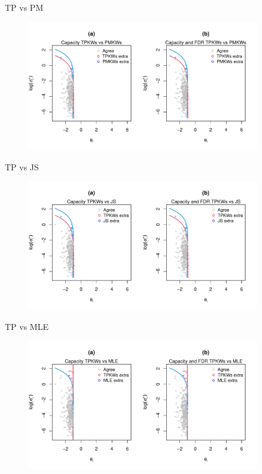 \documentclass[10pt,mathserif,aspectratio=169]{beamer}
\begin{document}
\begin{frame}[label=tpcontour]{TP vs PM}
  \begin{figure}
    \centering
    \includegraphics[width=0.9\textwidth]{../../Figures/2013-2022/GMM_m/GLmix/Contour_Left_0.2_0.2_TPKWs_PMKWs.pdf}
  \end{figure}
  \hyperlink{tpselect}{}
\end{frame}

\begin{frame}{TP vs JS}
  \begin{figure}
    \centering
    \includegraphics[width=0.9\textwidth]{../../Figures/2013-2022/GMM_m/GLmix/Contour_Left_0.2_0.2_TPKWs_JS.pdf}
  \end{figure}
\end{frame}

\begin{frame}{TP vs MLE}
  \begin{figure}
    \centering
    \includegraphics[width=0.9\textwidth]{../../Figures/2013-2022/GMM_m/GLmix/Contour_Left_0.2_0.2_TPKWs_MLE.pdf}
  \end{figure}
\end{frame}
\end{document}
